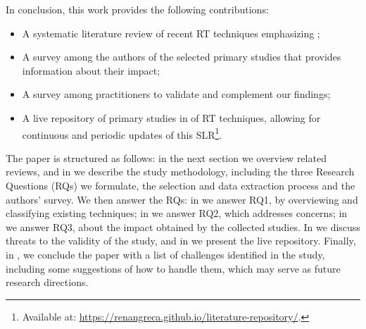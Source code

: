 In conclusion, this work provides the following contributions:
\begin{itemize}
	\item A systematic literature review of recent RT techniques  emphasizing \rea;
	\item A survey among the authors of the selected primary studies that provides information about their impact;
	\item A survey among practitioners to validate and complement our findings;
	\item A live repository of primary studies in \rea of RT techniques, allowing for continuous and periodic updates of this SLR\footnote{Available at: \url{https://renangreca.github.io/literature-repository/}.}.
\end{itemize}

The paper is structured as follows: 
in the next section we  overview related reviews, and
in  we describe the study methodology, including the three Research Questions (RQs) we formulate, the selection and data extraction process and the authors' survey.
We then answer the RQs: 
in  we answer RQ1, by overviewing and classifying existing techniques;
in  we answer RQ2, which addresses \rea concerns; 
in  we answer RQ3, about the impact obtained by the collected studies.
In  we discuss threats to the validity of the study, and
in  we present the live repository.
Finally, in , we 
conclude the paper with a list of challenges identified in the study, including some suggestions of how to handle them, which may serve as future research directions.
